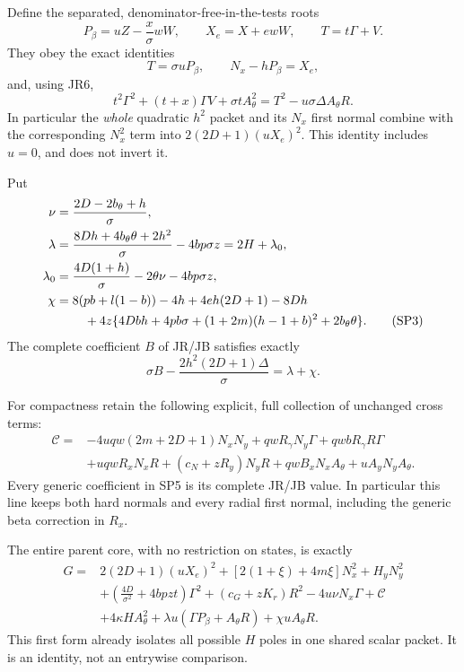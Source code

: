 Define the separated, denominator-free-in-the-tests roots
\[
 P_\beta=uZ-\frac{x}{\sigma}wW,\qquad
 X_e=X+ewW,\qquad T=t\Gamma+V.
\]
They obey the exact identities
\[
 T=\sigma uP_\beta,\qquad N_x-hP_\beta=X_e,
 \tag{SP1}
\]
and, using JR6,
\[
 t^2\Gamma^2+(t+x)\Gamma V+\sigma tA_\theta^2
 =T^2-u\sigma\Delta A_\theta R.
 \tag{SP2}
\]
In particular the \emph{whole} quadratic $h^2$ packet and its
$N_x$ first normal combine with the corresponding $N_x^2$ term into
$2(2D+1)(uX_e)^2$. This identity includes $u=0$, and does not invert it.

Put
\begin{align*}
 \nu&=\frac{2D-2b_\theta+h}{\sigma},\\
 \lambda&=\frac{8Dh+4b_\theta\theta+2h^2}{\sigma}
                    -4bp\sigma z=2H+\lambda_0,\\
 \lambda_0&=\frac{4D(1+h)}{\sigma}-2\theta\nu-4bp\sigma z,\\
 \chi&=8(pb+l(1-b))-4h+4eh(2D+1)-8Dh\\
 &\hspace{8mm}+4z\{4Dbh+4pb\sigma+(1+2m)(h-1+b)^2
                                      +2b_\theta\theta\}.
 \tag{SP3}
\end{align*}
The complete coefficient $B$ of JR/JB satisfies exactly
\[
 \sigma B-\frac{2h^2(2D+1)\Delta}{\sigma}=\lambda+\chi.
 \tag{SP4}
\]

For compactness retain the following explicit, full collection of
unchanged cross terms:
\begin{align*}
 \mathscr C={}&-4uqw(2m+2D+1)N_xN_y
 +qwR_\gamma N_y\Gamma+qwbR_\gamma R\Gamma\\
 &+uqwR_xN_xR+(c_N+zR_y)N_yR
 +qwB_xN_xA_\theta+uA_yN_yA_\theta.
 \tag{SP5}
\end{align*}
Every generic coefficient in SP5 is its complete JR/JB value. In
particular this line keeps both hard normals and every radial first
normal, including the generic beta correction in $R_x$.

The entire parent core, with no restriction on states, is exactly
\begin{align*}
G={}&2(2D+1)(uX_e)^2
 +[2(1+\xi)+4m\xi]N_x^2+H_yN_y^2\\
 &+\left(\frac{4D}{\sigma^2}+4bpzt\right)\Gamma^2
 +(c_G+zK_r)R^2-4u\nu N_x\Gamma+\mathscr C\\
 &+4\kappa H A_\theta^2
 +\lambda u(\Gamma P_\beta+A_\theta R)
 +\chi uA_\theta R.
 \tag{SP6}
\end{align*}
This first form already isolates all possible $H$ poles in one
shared scalar packet. It is an identity, not an entrywise comparison.

